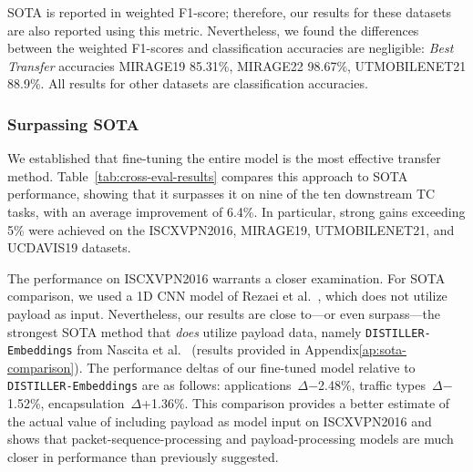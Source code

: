 \documentclass[lettersize,journal,twoside,article]{IEEEtran}
\newcommand{\tabref}[1]{Table~\ref{#1}}
\begin{document}
\begin{table}[!ht]
\begin{threeparttable}
\begin{tablenotes}
\item[$\dag$] SOTA is reported in weighted F1-score; therefore, our results for these datasets are also reported using this metric. Nevertheless, we found the differences between the weighted F1-scores and classification accuracies are negligible: \textit{Best Transfer} accuracies MIRAGE19 85.31\%, MIRAGE22 98.67\%, UTMOBILENET21 88.9\%. All results for other datasets are classification accuracies.

\end{tablenotes}
\end{threeparttable}
\end{table}

\subsubsection{Surpassing SOTA}
\label{sec:surpassing-sota}
We established that fine-tuning the entire model is the most effective transfer method. \tabref{tab:cross-eval-results} compares this approach to SOTA performance, showing that it surpasses it on nine of the ten downstream TC tasks, with an average improvement of 6.4\%. In particular, strong gains exceeding 5\% were achieved on the ISCXVPN2016, MIRAGE19, UTMOBILENET21, and UCDAVIS19 datasets.

The performance on ISCXVPN2016 warrants a closer examination. For SOTA comparison, we used a 1D CNN model of Rezaei et al.~\cite{Rezaei2020Multitask}, which does not utilize payload as input. Nevertheless, our results are close to---or even surpass---the strongest SOTA method that \textit{does} utilize payload data, namely \texttt{DISTILLER-Embeddings} from Nascita et al.~\cite{Nascita2023Embeddings} (results provided in Appendix\ref{ap:sota-comparison}). The performance deltas of our fine-tuned model relative to \texttt{DISTILLER-Embeddings} are as follows: applications~$\Delta$$-$2.48\%, traffic types~$\Delta$$-$1.52\%, encapsulation~$\Delta$+1.36\%. This comparison provides a better estimate of the actual value of including payload as model input on ISCXVPN2016 and shows that packet-sequence-processing and payload-processing models are much closer in performance than previously suggested.
\end{document}
